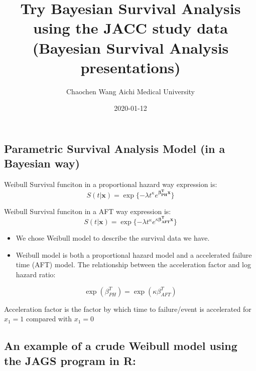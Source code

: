 \documentclass[]{tufte-handout}
\title{Try Bayesian Survival Analysis using the JACC study data (Bayesian
Survival Analysis presentations)}
\author{Chaochen Wang \textbar{} Aichi Medical University}
\date{2020-01-12}
\begin{document}
\maketitle




\hypertarget{parametric-survival-analysis-model-in-a-bayesian-way}{%
\subsection{Parametric Survival Analysis Model (in a Bayesian
way)}\label{parametric-survival-analysis-model-in-a-bayesian-way}}

\begin{marginfigure}
Weibull Survival funciton in a proportional hazard way expression is:
\[S(t | \mathbf{x}) = \exp\{ -\lambda t ^\kappa e^{\mathbf{\beta_{PH}^T x}} \}\]
\end{marginfigure}

\begin{marginfigure}
Weibull Survival funciton in a AFT way expression is:
\[S(t | \mathbf{x}) = \exp\{ -\lambda t ^\kappa e^{\kappa\mathbf{\beta_{AFT}^T x}} \}\]
\end{marginfigure}

\begin{itemize}
\item
  We chose Weibull model to describe the survival data we have.
\item
  Weibull model is both a proportional hazard model and a accelerated
  failure time (AFT) model. The relationship between the acceleration
  factor and log hazard ratio:
\end{itemize}

\[
\exp(\beta^T_{PH}) = \exp(\kappa\beta^T_{AFT})
\]

\begin{marginfigure}
Acceleration factor is the factor by which time to failure/event is
accelerated for \(x_1 = 1\) compared with \(x_1 = 0\)
\end{marginfigure}

\hypertarget{an-example-of-a-crude-weibull-model-using-the-jags-program-in-r}{%
\subsection{An example of a crude Weibull model using the JAGS program
in
R:}\label{an-example-of-a-crude-weibull-model-using-the-jags-program-in-r}}
\end{document}
